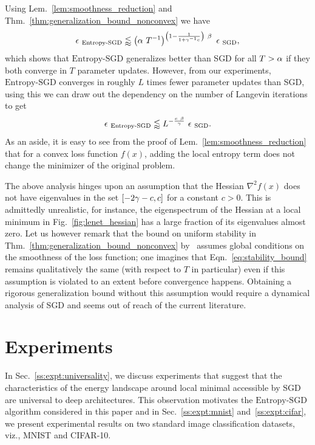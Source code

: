 \documentclass[10pt]{article}
\newcommand{\entropysgd}{\mathrm{Entropy}\textrm{-}\mathrm{SGD}}
\newcommand{\pc}[2]{{\color{ForestGreen}#1}\marginpar{\tiny\noindent{\raggedright{\color{Sienna}[PC]}\color{Sienna}{#2} \par}}}
\begin{document}
%
Using Lem.~\ref{lem:smoothness_reduction} and Thm.~\ref{thm:generalization_bound_nonconvex} we have
\begin{equation}
    \e_{\ \entropysgd} \lessapprox \rbrac{\a\ T^{-1}}^{\rbrac{1 - \f{1}{1 + \g^{-1}c}}\ \b}\ \e_{\ \textrm{SGD}},
    \label{eq:stability_bound}
\end{equation}
which shows that $\entropysgd$ generalizes better than SGD for all $T > \alpha$ if they both converge in $T$ parameter updates. However, from our experiments, $\entropysgd$ converges in roughly $L$ times fewer parameter updates than SGD, using this we can draw out the dependency on the number of Langevin iterations to get
$$
    \e_{\ \entropysgd} \lessapprox L^{-\f{c\ \b}{\g}}\ \e_{\ \textrm{SGD}}.
$$
As an aside, it is easy to see from the proof of Lem.~\ref{lem:smoothness_reduction} that for a convex loss function $f(x)$, adding the local entropy term does not change the minimizer of the original problem.

\pc{
\begin{remark}
The above analysis hinges upon an assumption that the Hessian $\nabla^2 f(x)$ does not have eigenvalues in the set $[-2\gamma-c, c]$ for a constant $c > 0$. This is admittedly unrealistic, for instance, the eigenspectrum of the Hessian at a local minimum in Fig.~\ref{fig:lenet_hessian} has a large fraction of its eigenvalues almost zero. Let us however remark that the bound on uniform stability in Thm.~\ref{thm:generalization_bound_nonconvex} by~\citet{hardt2015train} assumes global conditions on the smoothness of the loss function; one imagines that Eqn.~\ref{eq:stability_bound} remains qualitatively the same (with respect to $T$ in particular) even if this assumption is violated to an extent before convergence happens. Obtaining a rigorous generalization bound without this assumption would require a dynamical analysis of SGD and seems out of reach of the current literature.
\end{remark}
}{}

\section{Experiments}
\label{s:expt}

In Sec.~\ref{ss:expt:universality}, we discuss experiments that suggest that the characteristics of the energy landscape around local minimal accessible by SGD are universal to deep architectures.  This observation motivates the $\entropysgd$ algorithm considered in this paper and in Sec.~\ref{ss:expt:mnist} and~\ref{ss:expt:cifar}, we present experimental results on two standard image classification datasets, viz., MNIST and CIFAR-10.
\end{document}
